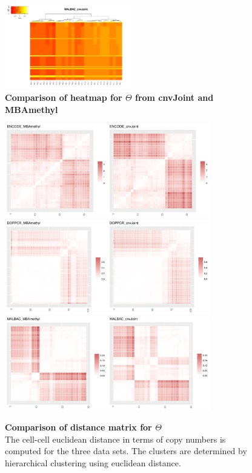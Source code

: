 \documentclass[11pt]{article}
\begin{document}
\begin{figure}[h]
\includegraphics[width=0.49\textwidth]{lung_cnvJoint_theta_heat.pdf}
\caption{\label{thetaheatmap}
\textbf{Comparison of heatmap for $\Theta$ from cnvJoint and MBAmethyl}
}
\end{figure}

\begin{figure}[h]
\centering
\includegraphics[width=0.8\textwidth]{encode_distmat_heat.pdf}\\
\includegraphics[width=0.8\textwidth]{poly_distmat_heat.pdf}\\
\includegraphics[width=0.8\textwidth]{lung_distmat_heat.pdf}\\
\caption{\label{distmat_heat}
\textbf{Comparison of distance matrix for $\Theta$}\\
The cell-cell euclidean distance in terms of copy numbers is computed for the three data sets. The clusters are determined by hierarchical clustering using euclidean distance. 
}
\end{figure}
\end{document}
